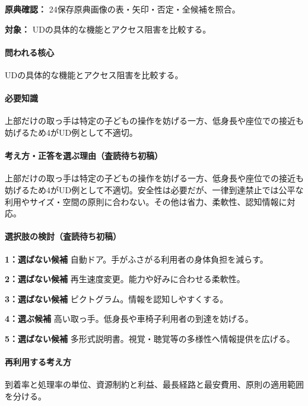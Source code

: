 \noindent\textbf{原典確認：} 24保存原典画像の表・矢印・否定・全候補を照合。\par

\noindent\textbf{対象：} UDの具体的な機能とアクセス阻害を比較する。\par

\paragraph{問われる核心} UDの具体的な機能とアクセス阻害を比較する。

\paragraph{必要知識} 上部だけの取っ手は特定の子どもの操作を妨げる一方、低身長や座位での接近も妨げるため4がUD例として不適切。

\paragraph{考え方・正答を選ぶ理由（査読待ち初稿）} 上部だけの取っ手は特定の子どもの操作を妨げる一方、低身長や座位での接近も妨げるため4がUD例として不適切。安全性は必要だが、一律到達禁止では公平な利用やサイズ・空間の原則に合わない。その他は省力、柔軟性、認知情報に対応。

\paragraph{選択肢の検討（査読待ち初稿）}\mbox{}\par

\noindent\textbf{1：選ばない候補} 自動ドア。手がふさがる利用者の身体負担を減らす。\par

\noindent\textbf{2：選ばない候補} 再生速度変更。能力や好みに合わせる柔軟性。\par

\noindent\textbf{3：選ばない候補} ピクトグラム。情報を認知しやすくする。\par

\noindent\textbf{4：選ぶ候補} 高い取っ手。低身長や車椅子利用者の到達を妨げる。\par

\noindent\textbf{5：選ばない候補} 多形式説明書。視覚・聴覚等の多様性へ情報提供を広げる。\par

\paragraph{再利用する考え方} 到着率と処理率の単位、資源制約と利益、最長経路と最安費用、原則の適用範囲を分ける。

